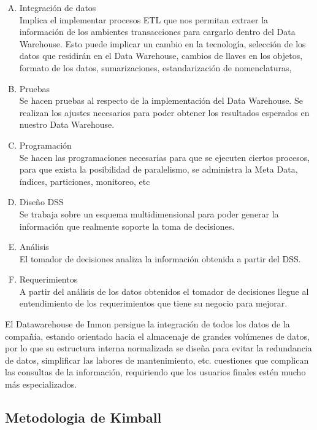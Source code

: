 \documentclass[11pt,a4paper]{article}
\begin{document}
\begin{enumerate}[A.]
\begin{enumerate}[i.]
			\end{enumerate}
		\item Integración de datos\\
		Implica el implementar procesos ETL que nos permitan extraer la información de los ambientes transacciones para cargarlo dentro del Data Warehouse. Esto puede implicar un cambio en la tecnología, selección de los datos que residirán en el Data Warehouse, cambios de llaves en los objetos, formato de los datos, sumarizaciones, estandarización de nomenclaturas,
		\item Pruebas\\
		Se hacen pruebas al respecto de la implementación del Data Warehouse. Se realizan los ajustes necesarios para poder obtener los resultados esperados en nuestro Data Warehouse.
		\item Programación\\
		Se hacen las programaciones necesarias para que se ejecuten ciertos procesos, para que exista la posibilidad de paralelismo, se administra la Meta Data, índices, particiones, monitoreo, etc
		\item Diseño DSS\\
		Se trabaja sobre un esquema multidimensional para poder generar la información que realmente soporte la toma de decisiones.
		\item Análisis\\
		El tomador de decisiones analiza la información obtenida a partir del DSS.
		\item Requerimientos\\
		A partir del análisis de los datos obtenidos el tomador de decisiones llegue al entendimiento de los requerimientos que tiene su negocio para mejorar.
		
		\end{enumerate}
		El Datawarehouse de Inmon persigue la integración de todos los datos de la compañía, estando orientado hacia el almacenaje de grandes volúmenes de datos, por lo que su estructura interna normalizada se diseña para evitar la redundancia de datos, simplificar las labores de mantenimiento, etc. cuestiones que complican las consultas de la información, requiriendo que los usuarios finales estén mucho más especializados.	
		
		\subsection{Metodologia de Kimball}
	
\end{document}

